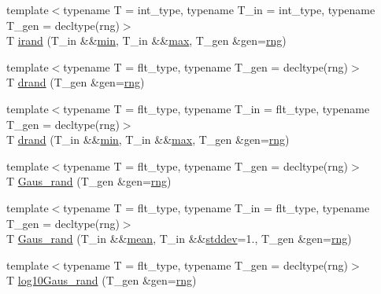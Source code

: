 \begin{DoxyCompactItemize}
\item 
{\footnotesize template$<$typename T  = int\+\_\+type, typename T\+\_\+in  = int\+\_\+type, typename T\+\_\+gen  = decltype(rng)$>$ }\\T \hyperlink{namespaceIceBRG_ab6adcd84220e59c9d57ea09c717e0632}{irand} (T\+\_\+in \&\&\hyperlink{namespaceIceBRG_aa6b6fb2d7875bb865ebaf20c5c9cbc85}{min}, T\+\_\+in \&\&\hyperlink{namespaceIceBRG_af8123f867f9a8c6a9703da8556182c84}{max}, T\+\_\+gen \&gen=\hyperlink{namespaceIceBRG_a43349d2fe56e49b46f2da45c2472137d}{rng})
\item 
{\footnotesize template$<$typename T  = flt\+\_\+type, typename T\+\_\+gen  = decltype(rng)$>$ }\\T \hyperlink{namespaceIceBRG_a3dc62dbc81a4973ecc1038db665b07f0}{drand} (T\+\_\+gen \&gen=\hyperlink{namespaceIceBRG_a43349d2fe56e49b46f2da45c2472137d}{rng})
\item 
{\footnotesize template$<$typename T  = flt\+\_\+type, typename T\+\_\+in  = flt\+\_\+type, typename T\+\_\+gen  = decltype(rng)$>$ }\\T \hyperlink{namespaceIceBRG_a78b425be2a3d71234c706b330b71acbc}{drand} (T\+\_\+in \&\&\hyperlink{namespaceIceBRG_aa6b6fb2d7875bb865ebaf20c5c9cbc85}{min}, T\+\_\+in \&\&\hyperlink{namespaceIceBRG_af8123f867f9a8c6a9703da8556182c84}{max}, T\+\_\+gen \&gen=\hyperlink{namespaceIceBRG_a43349d2fe56e49b46f2da45c2472137d}{rng})
\item 
{\footnotesize template$<$typename T  = flt\+\_\+type, typename T\+\_\+gen  = decltype(rng)$>$ }\\T \hyperlink{namespaceIceBRG_ab4693120c7a7cdf4e14f7524ab723ec0}{Gaus\+\_\+rand} (T\+\_\+gen \&gen=\hyperlink{namespaceIceBRG_a43349d2fe56e49b46f2da45c2472137d}{rng})
\item 
{\footnotesize template$<$typename T  = flt\+\_\+type, typename T\+\_\+in  = flt\+\_\+type, typename T\+\_\+gen  = decltype(rng)$>$ }\\T \hyperlink{namespaceIceBRG_a1e02559a05bc53757d08f048a3fb018f}{Gaus\+\_\+rand} (T\+\_\+in \&\&\hyperlink{namespaceIceBRG_a31912d66a78938bcc3e0fdbc917c5eec}{mean}, T\+\_\+in \&\&\hyperlink{namespaceIceBRG_a9db49a32658ae04d4e5780e90c58ae15}{stddev}=1., T\+\_\+gen \&gen=\hyperlink{namespaceIceBRG_a43349d2fe56e49b46f2da45c2472137d}{rng})
\item 
{\footnotesize template$<$typename T  = flt\+\_\+type, typename T\+\_\+gen  = decltype(rng)$>$ }\\T \hyperlink{namespaceIceBRG_a855ebb82510a9cbbec19be3ce5b160c0}{log10\+Gaus\+\_\+rand} (T\+\_\+gen \&gen=\hyperlink{namespaceIceBRG_a43349d2fe56e49b46f2da45c2472137d}{rng})

\end{DoxyCompactItemize}
